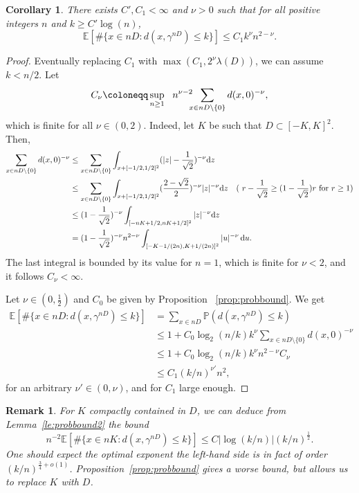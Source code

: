 \documentclass[11pt]{article}
\newtheorem{corollary}[theorem]{Corollary}
\newtheorem{remark}[theorem]{Remark}
\def\d{\,{\rm d}}
\begin{document}
\begin{corollary}
    \label{coro:vol}
    There exists $C',C_1<\infty$ and $\nu>0$ such that for all positive integers $n$ and $k\geq C' \log(n)$,
    \[
\mathbb{E}[\#\{ x\in n D: d(x,\gamma^{nD})\leq k  \}] \leq C_1  k^\nu n^{2-\nu}.
    \]
\end{corollary}
\begin{proof}
  Eventually replacing $C_1$ with $\max(C_1,2^\nu \lambda(D)) $, we can assume $k<n/2$. Let \[ C_\nu\coloneqq   \sup_{n\geq 1} \ \ n^{\nu-2} \hspace{-0.2cm}\sum_{x\in n D\setminus\{0\} } d(x,0)^{-\nu}, \]
  which is finite for all $\nu\in(0,2)$. Indeed, let $K$ be such that $D\subset [-K,K]^2$. Then,
    \begin{align*}
    \sum_{x\in n D\setminus\{0\} } d(x,0)^{-\nu}
    &\leq
    \sum_{x\in n D\setminus\{0\}}  \int_{x+[-1/2,1/2]^2  }    (|z|-\frac{1}{\sqrt{2}} )^{-\nu} \mathrm{d} z\\
    &  \leq \sum_{x\in n D\setminus\{0\}} \int_{x+[-1/2,1/2]^2  }  (\frac{2-\sqrt{2}}{2})^{-\nu} |z|^{-\nu }\mathrm{d} z\quad \text{( $r-\frac{1}{\sqrt{2}} \geq (1-\frac{1}{\sqrt{2}}) r$ for $r\geq 1$)}  \\
    &    \leq (1-\frac{1}{\sqrt{2}})^{-\nu} \int_{ [-n K+1/2,nK+1/2]^2 }|z|^{-\nu }\mathrm{d} z \\
    & = (1-\frac{1}{\sqrt{2}})^{-\nu} n^{2-\nu} \int_{[-K-1/(2n),K+1/(2n)]^2} |u|^{-\nu } \d u.
    \end{align*}
    The last integral is bounded by its value for $n=1$, which is finite for $\nu<2$, and it follows $C_\nu<\infty$.

    Let $\nu\in(0,\frac{1}{2})$ and $C_0$ be given by Proposition ~\ref{prop:probbound}. We get
    \begin{align*}
    \mathbb{E}[\#\{ x\in n D: d(x,\gamma^{nD})\leq k  \}]
    & = \sum_{x \in n D} \mathbb{P}(   d(x,\gamma^{nD})\leq k  )\\
    &\leq 1+
    C_0  \log_2(n/k) k^\nu \sum_{x \in n D\setminus \{0\} }  d(x,0)^{-\nu} \\
    & \leq 1+C_0 \log_2(n/k)  k^\nu n^{2-\nu} C_\nu \\
    & \leq C_1  (k/n)^{\nu'} n^2,
    \end{align*}
    for an arbitrary $\nu'\in (0,\nu)$, and for $C_1$ large enough.
\end{proof}
\begin{remark}
    For $K$ compactly contained in $D$, we can deduce from Lemma~\ref{le:probbound2} the bound
    \[
    n^{-2}\mathbb{E}[\#\{ x\in n K: d(x,\gamma^{nD})\leq k \}] \leq C|\log(k/n)| (k/n)^{\frac{1}{2}}.
    \]
   One should expect the optimal exponent the left-hand side is in fact of order $(k/n)^{\frac{3}{4}+o(1)}$. Proposition~\ref{prop:probbound} gives a worse bound, but allows us to replace $K$ with $D$.
\end{remark}
\end{document}
